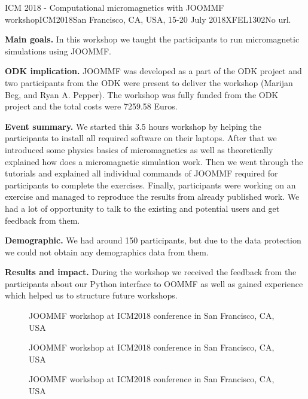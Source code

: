 \begin{event}{ICM 2018 - Computational micromagnetics with JOOMMF workshop}{ICM2018}{San Francisco, CA, USA, 15-20 July 2018}{XFEL}{130}{2}{No url.}

\textbf{Main goals.} In this workshop we taught the participants to run micromagnetic simulations using JOOMMF.

\textbf{ODK implication.} JOOMMF was developed as a part of the ODK project and two participants from the ODK were present to deliver the workshop (Marijan Beg, and Ryan A. Pepper). The workshop was fully funded from the ODK project and the total costs were 7259.58 Euros.

\textbf{Event summary.} We started this 3.5 hours workshop by helping the participants to install all required software on their laptops. After that we introduced some physics basics of micromagnetics as well as theoretically explained how does a micromagnetic simulation work. Then we went through the tutorials and explained all individual commands of JOOMMF required for participants to complete the exercises. Finally, participants were working on an exercise and managed to reproduce the results from already published work. We had a lot of opportunity to talk to the existing and potential users and get feedback from them.

\textbf{Demographic.} We had around 150 participants, but due to the data protection we could not obtain any demographics data from them.

\textbf{Results and impact.} During the workshop we received the feedback from the participants about our Python interface to OOMMF as well as gained experience which helped us to structure future workshops.

\begin{figure}[ht]

\caption*{JOOMMF workshop at ICM2018 conference in San Francisco, CA, USA}
\end{figure}

\begin{figure}[ht]

\caption*{JOOMMF workshop at ICM2018 conference in San Francisco, CA, USA}
\end{figure}

\begin{figure}[ht]

\caption*{JOOMMF workshop at ICM2018 conference in San Francisco, CA, USA}
\end{figure}

\end{event}
